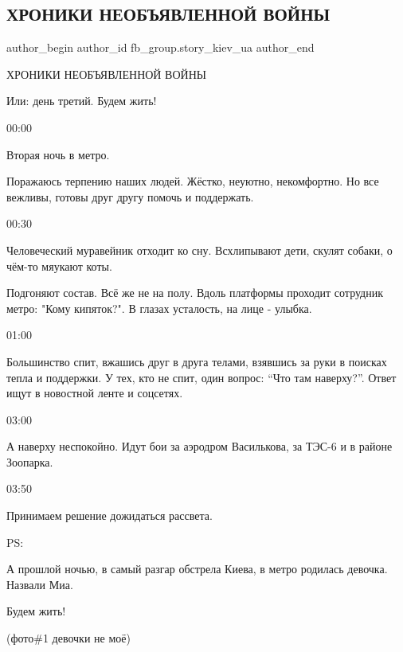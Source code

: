  
 
 
 
 
 
\subsection{ХРОНИКИ НЕОБЪЯВЛЕННОЙ ВОЙНЫ}
\label{sec:26_02_2022.fb.fb_group.story_kiev_ua.1.hroniki_vojny}
 
\ifcmt
 author_begin
   author_id fb_group.story_kiev_ua
 author_end
\fi


ХРОНИКИ НЕОБЪЯВЛЕННОЙ ВОЙНЫ

Или: день третий. Будем жить!

00:00

Вторая ночь в метро.

Поражаюсь терпению наших людей. Жёстко, неуютно, некомфортно. Но все вежливы,
готовы друг другу помочь и поддержать.

00:30

Человеческий муравейник отходит ко сну. Всхлипывают дети, скулят собаки, о
чём-то мяукают коты.

Подгоняют состав. Всё же не на полу. Вдоль платформы проходит сотрудник метро:
"Кому кипяток?". В глазах усталость, на лице - улыбка.

01:00

Большинство спит, вжашись друг в друга телами, взявшись за руки в поисках тепла
и поддержки. У тех, кто не спит, один вопрос: \enquote{Что там наверху?}. Ответ ищут в
новостной ленте и соцсетях.

03:00

А наверху неспокойно. Идут бои за аэродром Василькова, за ТЭС-6 и в районе
Зоопарка.

03:50

Принимаем решение дожидаться рассвета.

PS:

А прошлой ночью, в самый разгар обстрела Киева, в метро родилась девочка.
Назвали Миа.

Будем жить!

(фото\#1 девочки не моё)
